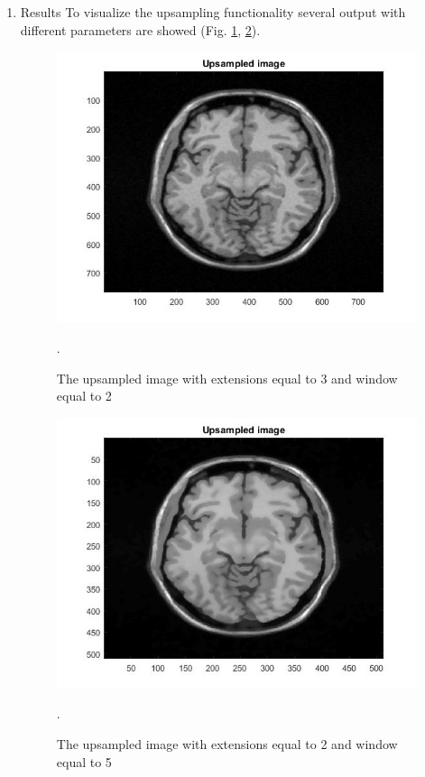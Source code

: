 \begin{enumerate}
\begin{itemize}
\end{itemize}
\item Results
To visualize the upsampling functionality several output with different parameters are showed (Fig. \ref{fig: Module10_6}, \ref{fig: Module10_7}).

\begin{figure}[H]
\centering{}\includegraphics[scale=0.5]{figures/Module_10/Module10_6}\caption{The upsampled image with extensions equal to 3 and window equal to 2}. 
\label{fig: Module10_6}
\end{figure}

\begin{figure}[H]
\centering{}\includegraphics[scale=0.5]{figures/Module_10/Module10_7}\caption{The upsampled image with extensions equal to 2 and window equal to 5}. 
\label{fig: Module10_7}
\end{figure}


\end{enumerate}
